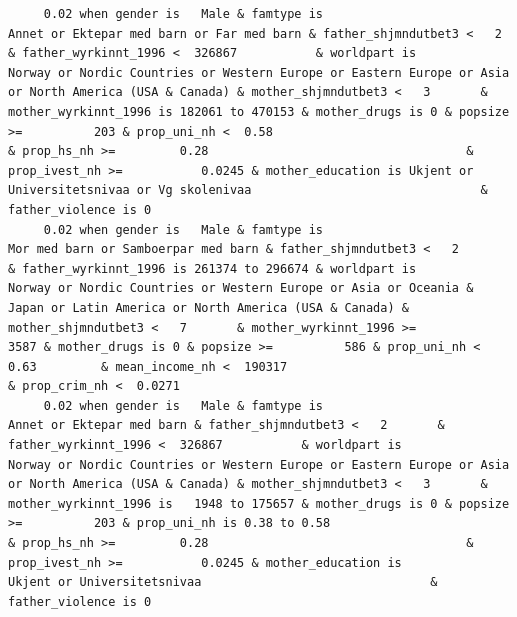 \documentclass[
  letterpaper,
  DIV=11,
  numbers=noendperiod]{scrreprt}
\begin{document}
\begin{verbatim}
     0.02 when gender is   Male & famtype is                        Annet or Ektepar med barn or Far med barn & father_shjmndutbet3 <   2       & father_wyrkinnt_1996 <  326867           & worldpart is                              Norway or Nordic Countries or Western Europe or Eastern Europe or Asia or North America (USA & Canada) & mother_shjmndutbet3 <   3       & mother_wyrkinnt_1996 is 182061 to 470153 & mother_drugs is 0 & popsize >=          203 & prop_uni_nh <  0.58                                              & prop_hs_nh >=         0.28                                    & prop_ivest_nh >=           0.0245 & mother_education is Ukjent or Universitetsnivaa or Vg skolenivaa                                & father_violence is 0                                                                                                               
     0.02 when gender is   Male & famtype is                              Mor med barn or Samboerpar med barn & father_shjmndutbet3 <   2       & father_wyrkinnt_1996 is 261374 to 296674 & worldpart is            Norway or Nordic Countries or Western Europe or Asia or Oceania & Japan or Latin America or North America (USA & Canada) & mother_shjmndutbet3 <   7       & mother_wyrkinnt_1996 >=             3587 & mother_drugs is 0 & popsize >=          586 & prop_uni_nh <  0.63         & mean_income_nh <  190317                                        & prop_crim_nh <  0.0271                                                                                                                                                                                                                                                                                      
     0.02 when gender is   Male & famtype is                                        Annet or Ektepar med barn & father_shjmndutbet3 <   2       & father_wyrkinnt_1996 <  326867           & worldpart is                              Norway or Nordic Countries or Western Europe or Eastern Europe or Asia or North America (USA & Canada) & mother_shjmndutbet3 <   3       & mother_wyrkinnt_1996 is   1948 to 175657 & mother_drugs is 0 & popsize >=          203 & prop_uni_nh is 0.38 to 0.58                                      & prop_hs_nh >=         0.28                                    & prop_ivest_nh >=           0.0245 & mother_education is                  Ukjent or Universitetsnivaa                                & father_violence is 0                                                                                                               

\end{verbatim}
\end{document}
